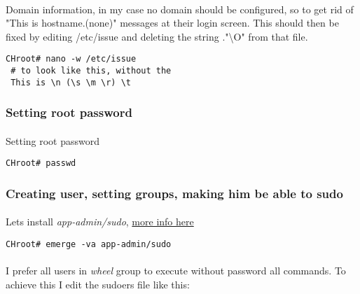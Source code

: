 \documentclass[11pt,a4paper]{article}
\begin{document}
                    \paragraph{} Domain information, in my case no domain should be configured, so to get rid of "This is hostname.(none)" messages at their login screen. This should then be fixed by editing /etc/issue and deleting the string ."\textbackslash O" from that file.

                    \begin{lstlisting}[style=BashInputCHRoot]
 CHroot# nano -w /etc/issue
 # to look like this, without the
 This is \n (\s \m \r) \t
                    \end{lstlisting}

                \newpage
                \subsubsection{Setting root password}

                    \paragraph{} Setting root password

                    \begin{lstlisting}[style=BashInputCHRoot]
 CHroot# passwd
                    \end{lstlisting}

                \newpage
                \subsubsection{Creating user, setting groups, making him be able to sudo}

                    \paragraph{} Lets install \textit{app-admin/sudo},  \href{https://wiki.gentoo.org/wiki/Sudo}{more info here}

                    \begin{lstlisting}[style=BashInputCHRoot]
 CHroot# emerge -va app-admin/sudo
                    \end{lstlisting}

                    \paragraph{} I prefer all users in \textit{wheel} group to execute without password all commands. To achieve this I edit the sudoers file like this:
\end{document}
